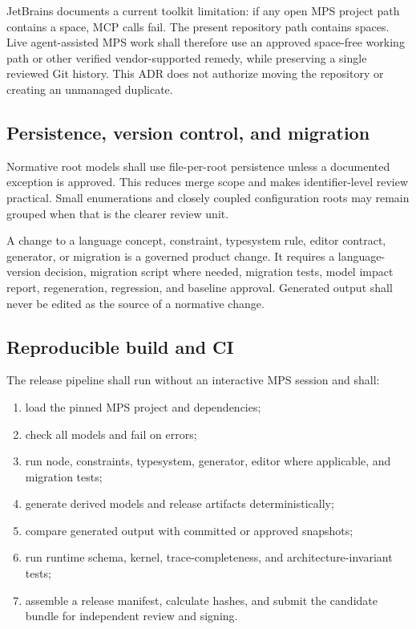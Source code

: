 \documentclass[11pt,letterpaper]{article}
\begin{document}
JetBrains documents a current toolkit limitation: if any open MPS project path contains a space, MCP calls fail. The present repository path contains spaces. Live agent-assisted MPS work shall therefore use an approved space-free working path or other verified vendor-supported remedy, while preserving a single reviewed Git history. This ADR does not authorize moving the repository or creating an unmanaged duplicate.

\subsection{Persistence, version control, and migration}

Normative root models shall use file-per-root persistence unless a documented exception is approved. This reduces merge scope and makes identifier-level review practical. Small enumerations and closely coupled configuration roots may remain grouped when that is the clearer review unit.

A change to a language concept, constraint, typesystem rule, editor contract, generator, or migration is a governed product change. It requires a language-version decision, migration script where needed, migration tests, model impact report, regeneration, regression, and baseline approval. Generated output shall never be edited as the source of a normative change.

\subsection{Reproducible build and CI}

The release pipeline shall run without an interactive MPS session and shall:

\begin{enumerate}
\item load the pinned MPS project and dependencies;
\item check all models and fail on errors;
\item run node, constraints, typesystem, generator, editor where applicable, and migration tests;
\item generate derived models and release artifacts deterministically;
\item compare generated output with committed or approved snapshots;
\item run runtime schema, kernel, trace-completeness, and architecture-invariant tests;
\item assemble a release manifest, calculate hashes, and submit the candidate bundle for independent review and signing.
\end{enumerate}
\end{document}
